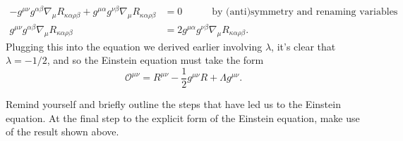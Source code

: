 \documentclass{../../templates/lkx_pset}
\begin{document}
\begin{solution}
\[\begin{aligned}
			- g^{\mu\nu} g^{\alpha\beta} \nabla_\mu R_{\kappa\alpha\rho\beta}
			+ g^{\mu\alpha} g^{\nu\beta} \nabla_\mu R_{\kappa\alpha\rho\beta}
			                                                              & =0 \hspace{3em}\textrm{by (anti)symmetry and renaming variables}                      \\
			g^{\mu\nu}g^{\alpha\beta}\nabla_\mu R_{\kappa\alpha\rho\beta} & = 2g^{\mu\alpha}g^{\nu\beta}\nabla_\mu R_{\kappa\alpha\rho\beta}.
		\end{aligned}
	\]
	Plugging this into the equation we derived earlier involving $\lambda$, it's clear that $\lambda = -1/2$, and so the Einstein equation must take the form
	\[
		\mathcal{O}^{\mu\nu} = R^{\mu\nu} - \frac{1}{2}g^{\mu\nu} R + \Lambda g^{\mu\nu}.
	\]
\end{solution}

\begin{problem}{6}
Remind yourself and briefly outline the steps that have led us to the Einstein equation. At the final step to the explicit form of the Einstein equation, make use of the result shown above.
\end{problem}
\end{document}
